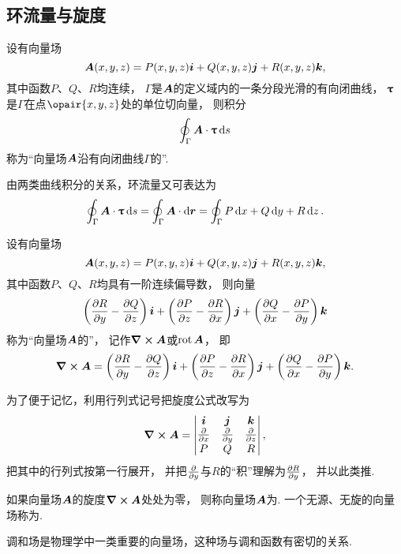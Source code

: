 \subsection{环流量与旋度}
\begin{definition}
设有向量场\[
\boldsymbol{A}(x,y,z)=P(x,y,z)\boldsymbol{i}+Q(x,y,z)\boldsymbol{j}+R(x,y,z)\boldsymbol{k},
\]其中函数\(P\)、\(Q\)、\(R\)均连续，
\(\Gamma\)是\(\boldsymbol{A}\)的定义域内的一条分段光滑的有向闭曲线，
\(\boldsymbol{\uptau}\)是\(\Gamma\)在点\(\opair{x,y,z}\)处的单位切向量，
则积分\[
	\oint_\Gamma \boldsymbol{A}\cdot\boldsymbol{\uptau}\dd{s}
\]称为“向量场\(\boldsymbol{A}\)沿有向闭曲线\(\Gamma\)的”.
\end{definition}
由两类曲线积分的关系，环流量又可表达为\[
	\oint_\Gamma \boldsymbol{A}\cdot\boldsymbol{\uptau}\dd{s}
	=\oint_\Gamma \boldsymbol{A}\cdot\dd{\boldsymbol{r}}
	=\oint_\Gamma P\dd{x}+Q\dd{y}+R\dd{z}.
\]

\begin{definition}
设有向量场\[
	\boldsymbol{A}(x,y,z)=P(x,y,z)\boldsymbol{i}+Q(x,y,z)\boldsymbol{j}+R(x,y,z)\boldsymbol{k},
\]
其中函数\(P\)、\(Q\)、\(R\)均具有一阶连续偏导数，
则向量\[
	\left( \pdv{R}{y} - \pdv{Q}{z} \right)\boldsymbol{i}
	+\left( \pdv{P}{z} - \pdv{R}{x} \right)\boldsymbol{j}
	+\left( \pdv{Q}{x} - \pdv{P}{y} \right)\boldsymbol{k}
\]
称为“向量场\(\boldsymbol{A}\)的”，
记作\(\curl{\boldsymbol{A}}\)或\(\operatorname{rot}\boldsymbol{A}\)，
即\[
	\curl{\boldsymbol{A}}
	=\left( \pdv{R}{y} - \pdv{Q}{z} \right)\boldsymbol{i}
	+\left( \pdv{P}{z} - \pdv{R}{x} \right)\boldsymbol{j}
	+\left( \pdv{Q}{x} - \pdv{P}{y} \right)\boldsymbol{k}.
\]
\end{definition}

为了便于记忆，利用行列式记号把旋度公式改写为\[
	\curl{\boldsymbol{A}}
	=\begin{vmatrix}
		\boldsymbol{i} & \boldsymbol{j} & \boldsymbol{k} \\
		\pdv{x} & \pdv{y} & \pdv{z} \\
		P & Q & R \\
	\end{vmatrix},
\]
把其中的行列式按第一行展开，
并把\(\pdv{y}\)与\(R\)的“积”理解为\(\pdv{R}{y}\)，
并以此类推.

\begin{definition}
如果向量场\(\boldsymbol{A}\)的旋度\(\curl{\boldsymbol{A}}\)处处为零，
则称向量场\(\boldsymbol{A}\)为.
一个无源、无旋的向量场称为.
\end{definition}
调和场是物理学中一类重要的向量场，这种场与调和函数有密切的关系.

